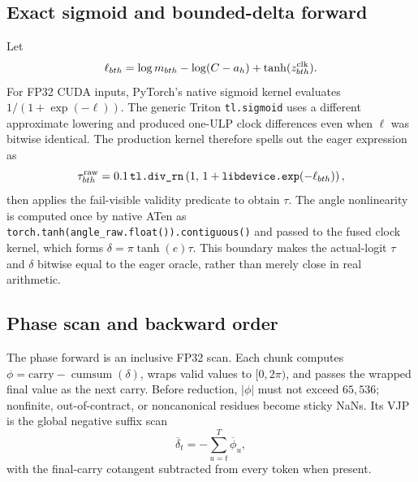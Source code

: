 \documentclass[11pt]{article}
\begin{document}
\subsection{Exact sigmoid and bounded-delta forward}

Let
\begin{equation}
  \ell_{bth}=\log m_{bth}-\log(C-a_h)+\tanh(z^{\rm clk}_{bth}).
\end{equation}
For FP32 CUDA inputs, PyTorch's native sigmoid kernel evaluates
$1/(1+\exp(-\ell))$.  The generic Triton \texttt{tl.sigmoid} uses a different approximate
lowering and produced one-ULP clock differences even when $\ell$ was bitwise identical.  The
production kernel therefore spells out the eager expression as
\begin{equation}
  \tau^{\rm raw}_{bth}
  =0.1\,\texttt{tl.div\_rn}
    \left(1,\,1+\texttt{libdevice.exp}(-\ell_{bth})\right),
  \label{eq:exact-sigmoid}
\end{equation}
then applies the fail-visible validity predicate to obtain $\tau$.  The angle nonlinearity is
computed once by native ATen as
\texttt{torch.tanh(angle\_raw.float()).contiguous()} and passed to the fused clock kernel, which
forms $\delta=\pi\tanh(e)\tau$.  This boundary makes the actual-logit $\tau$ and $\delta$ bitwise
equal to the eager oracle, rather than merely close in real arithmetic.

\subsection{Phase scan and backward order}

The phase forward is an inclusive FP32 scan.  Each chunk computes
$\phi=\mathrm{carry}-\operatorname{cumsum}(\delta)$, wraps valid values to $[0,2\pi)$, and passes the
wrapped final value as the next carry.  Before reduction, $|\phi|$ must not exceed $65{,}536$;
nonfinite, out-of-contract, or noncanonical residues become sticky NaNs.  Its VJP is the global
negative suffix scan
\begin{equation}
  \overline\delta_t=-\sum_{u=t}^{T}\overline\phi_u,
  \label{eq:phase-vjp}
\end{equation}
with the final-carry cotangent subtracted from every token when present.
\end{document}
